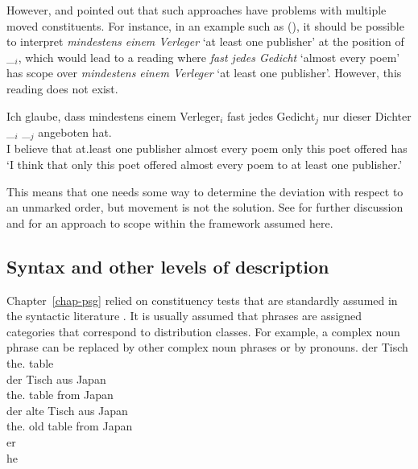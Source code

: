 \noindent
However, \citet[]{Kiss2001a} and \citet[Section~2.6]{Fanselow2001a} pointed out that such
approaches have problems with multiple moved constituents. For instance, in an example such as
(), it should be possible to interpret \emph{mindestens einem Verleger} `at least one
publisher' at the position of \_$_i$, which would lead to a reading where \emph{fast jedes Gedicht}
`almost every poem' has scope over \emph{mindestens einem Verleger} `at least one
publisher'. However, this reading does not exist.


\ea
\gll Ich glaube, dass mindestens einem Verleger$_i$ fast jedes Gedicht$_j$ nur dieser Dichter \_$_i$ \_$_j$ angeboten hat.\\
     I believe that at.least one publisher almost every poem only this poet {} {} offered has\\
\glt `I think that only this poet offered almost every poem to at least one publisher.'
\z

This means that one needs some way to determine the deviation with respect to an unmarked order, but
movement is not the solution. See  for further discussion and
\citet{Kiss2001a} for an approach to scope within the framework assumed here.

\subsection{Syntax and other levels of description}
\label{sec-down-to-earth-syntax}

Chapter~\ref{chap-psg} relied on constituency tests that are standardly assumed in the syntactic
literature \parencites[24--31]{Borsley91a}[35--36]{Haegeman94a-u}[20--23]{HP2002a-ed}[29--33]{SWB2003a}[19--22]{KS2008a-u}[Chapter~1.3]{MuellerGT-Eng}{MyP2022a}.
It is usually assumed that phrases are assigned categories that correspond to distribution
classes. For example, a complex noun phrase can be replaced by other complex noun phrases or by
pronouns. 
\eal
\label{ex-np-tisch}
\ex 
\gll der Tisch\\
     the.\NOM{} table\\
\ex 
\gll der Tisch aus Japan\\
     the.\NOM{} table from Japan\\
\ex 
\gll der alte Tisch aus Japan\\
     the.\NOM{} old  table from Japan\\
\ex 
\gll er\\
     he\\
\zl

